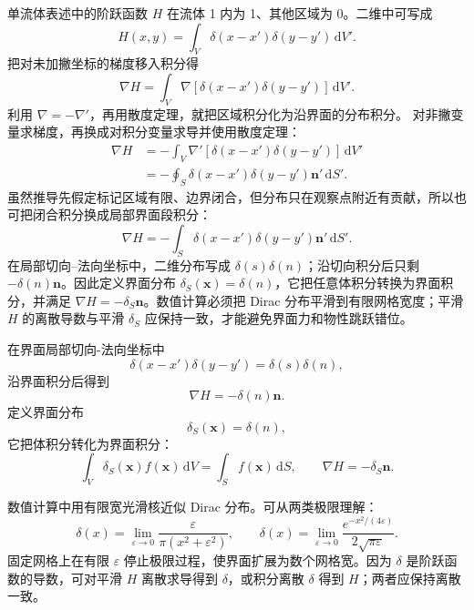 \documentclass[11pt,a4paper,openany,fontset=none]{ctexbook}
\begin{document}
单流体表述中的阶跃函数 $H$ 在流体 1 内为 1、其他区域为 0。二维中可写成
\begin{equation}
 H(x,y)=\int_V\delta(x-x')\delta(y-y')\,\mathrm dV'. \tag{B.1}
\end{equation}
把对未加撇坐标的梯度移入积分得
\begin{equation}
 \nabla H=\int_V\nabla[\delta(x-x')\delta(y-y')]\,\mathrm dV'. \tag{B.2}
\end{equation}
利用 $\nabla=-\nabla'$，再用散度定理，就把区域积分化为沿界面的分布积分。
对非撇变量求梯度，再换成对积分变量求导并使用散度定理：
\begin{align}
 \nabla H&=-\int_V\nabla'[\delta(x-x')\delta(y-y')]\,\mathrm dV' \tag{B.3}\\
 &=-\oint_S\delta(x-x')\delta(y-y')\bm n'\,\mathrm dS'. \tag{B.4}
\end{align}
虽然推导先假定标记区域有限、边界闭合，但分布只在观察点附近有贡献，所以也可把闭合积分换成局部界面段积分：
\begin{equation}
 \nabla H=-\int_S\delta(x-x')\delta(y-y')\bm n'\,\mathrm dS'. \tag{B.5}
\end{equation}
在局部切向--法向坐标中，二维分布写成 $\delta(s)\delta(n)$；沿切向积分后只剩 $-\delta(n)\bm n$。因此定义界面分布 $\delta_S(\bm x)=\delta(n)$，它把任意体积分转换为界面积分，并满足 $\nabla H=-\delta_S\bm n$。数值计算必须把 Dirac 分布平滑到有限网格宽度；平滑 $H$ 的离散导数与平滑 $\delta_S$ 应保持一致，才能避免界面力和物性跳跃错位。

在界面局部切向-法向坐标中
\begin{equation}
 \delta(x-x')\delta(y-y')=\delta(s)\delta(n), \tag{B.6}
\end{equation}
沿界面积分后得到
\begin{equation}
 \nabla H=-\delta(n)\bm n. \tag{B.7}
\end{equation}
定义界面分布
\begin{equation}
 \delta_S(\bm x)=\delta(n), \tag{B.8}
\end{equation}
它把体积分转化为界面积分：
\begin{equation}
 \int_V\delta_S(\bm x)f(\bm x)\,\mathrm dV=\int_Sf(\bm x)\,\mathrm dS,
 \qquad \nabla H=-\delta_S\bm n. \tag{B.9--B.10}
\end{equation}

数值计算中用有限宽光滑核近似 Dirac 分布。可从两类极限理解：
\begin{equation}
 \delta(x)=\lim_{\varepsilon\to0}\frac{\varepsilon}{\pi(x^2+\varepsilon^2)},
 \qquad
 \delta(x)=\lim_{\varepsilon\to0}\frac{e^{-x^2/(4\varepsilon)}}{2\sqrt{\pi\varepsilon}}. \tag{B.11}
\end{equation}
固定网格上在有限 $\varepsilon$ 停止极限过程，使界面扩展为数个网格宽。因为 $\delta$ 是阶跃函数的导数，可对平滑 $H$ 离散求导得到 $\delta$，或积分离散 $\delta$ 得到 $H$；两者应保持离散一致。
\end{document}
